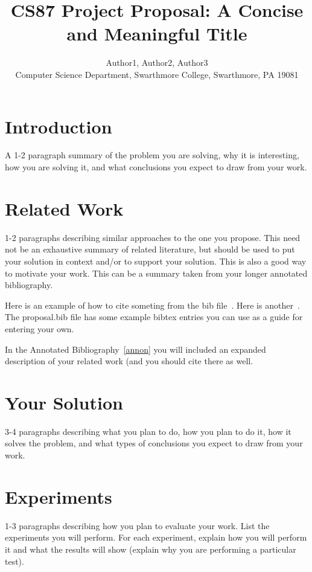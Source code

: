 \documentclass[11pt]{article}
\begin{document}

\title{CS87 Project Proposal: A Concise and Meaningful Title}

\author{Author1, Author2, Author3 \\ 
Computer Science Department, Swarthmore College, Swarthmore, PA  19081}

\maketitle

\section {Introduction}\label{intro} 
A 1-2 paragraph summary of the problem you are solving, why it is interesting,
how you are solving it, and what conclusions 
you expect to draw from your work.

\section {Related Work}\label{rel}
1-2 paragraphs describing similar approaches to the one you propose. This need
not be an exhaustive summary of related literature, but should be used to put
your solution in context and/or to support your solution. This is also a good
way to motivate your work. This can be a summary taken from your longer
annotated bibliography.  

Here is an example of how to cite someting from the bib 
file~\cite{newhall:nswap2L}.  Here is another~\cite{unixV}.  
The proposal.bib file has some example 
bibtex entries you can use as a guide for entering your own.

In the Annotated Bibliography~\ref{annon} you will included an expanded description of your related work (and you should cite there as well.

\section {Your Solution}\label{soln}
3-4 paragraphs describing what you plan to do, how you plan to do it, how it
solves the problem, and what types of conclusions you expect to draw from your
work.

\section {Experiments}\label{exper}
1-3 paragraphs describing how you plan to evaluate your work. List the
experiments you will perform. For each experiment, explain how you will perform
it and what the results will show (explain why you are performing a particular
test).
\end{document}
